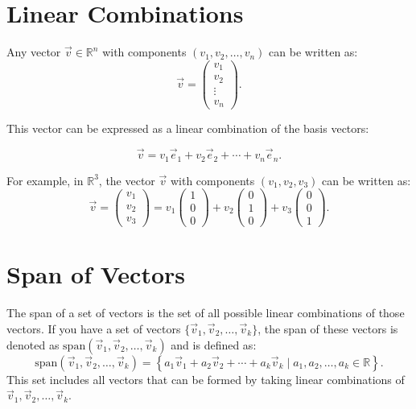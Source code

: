 \documentclass[10pt]{article}
\theoremstyle{plain}
\theoremstyle{definition}
\theoremstyle{remark}
\begin{document}
\section{Linear Combinations}

Any vector \(\vec{v} \in \mathbb{R}^n\) with components \((v_1, v_2, \ldots, v_n)\) can be written as:
\[
\vec{v} = \begin{pmatrix} v_1 \\ v_2 \\ \vdots \\ v_n \end{pmatrix}.
\]

This vector can be expressed as a linear combination of the basis vectors:

\[
\vec{v} = v_1 \vec{e}_1 + v_2 \vec{e}_2 + \cdots + v_n \vec{e}_n.
\]

For example, in \(\mathbb{R}^3\), the vector \(\vec{v}\) with components \((v_1, v_2, v_3)\) can be written as:
\[
\vec{v} = \begin{pmatrix} v_1 \\ v_2 \\ v_3 \end{pmatrix} = v_1 \begin{pmatrix} 1 \\ 0 \\ 0 \end{pmatrix} + v_2 \begin{pmatrix} 0 \\ 1 \\ 0 \end{pmatrix} + v_3 \begin{pmatrix} 0 \\ 0 \\ 1 \end{pmatrix}.
\]

\section{Span of Vectors}

The span of a set of vectors is the set of all possible linear combinations of those vectors. If you have a set of vectors \(\{\vec{v}_1, \vec{v}_2, \ldots, \vec{v}_k\}\), the span of these vectors is denoted as \(\text{span}(\vec{v}_1, \vec{v}_2, \ldots, \vec{v}_k)\) and is defined as:
\[
\text{span}(\vec{v}_1, \vec{v}_2, \ldots, \vec{v}_k) = \left\{ a_1 \vec{v}_1 + a_2 \vec{v}_2 + \cdots + a_k \vec{v}_k \mid a_1, a_2, \ldots, a_k \in \mathbb{R} \right\}.
\]
This set includes all vectors that can be formed by taking linear combinations of \(\vec{v}_1, \vec{v}_2, \ldots, \vec{v}_k\).\\
\end{document}
